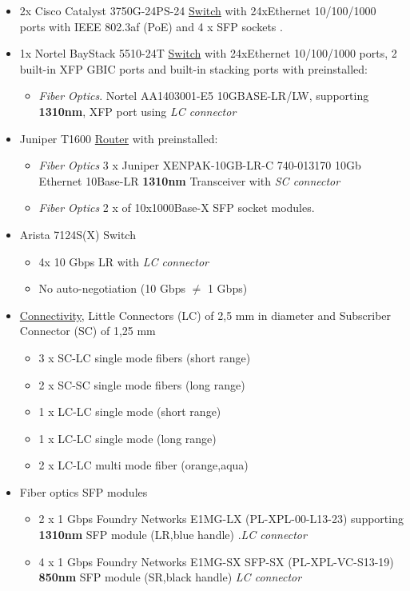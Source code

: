 \documentclass[10pt,a4paper]{article}
\begin{document}
\begin{itemize}
    \item 2x Cisco Catalyst 3750G-24PS-24 \underline{Switch} with 24xEthernet 10/100/1000 ports with IEEE 802.3af (PoE) and 4 x SFP sockets \cite{catalyst3750:datasheet}.
    \item 1x Nortel BayStack 5510-24T \underline{Switch} with 24xEthernet 10/100/1000 ports, 2 built-in XFP GBIC ports and built-in stacking ports \cite{Nortel-Networks-BayStack-5510-Switches} with preinstalled:
    \begin{itemize}
        \item \textit{Fiber Optics}. Nortel AA1403001-E5 10GBASE-LR/LW, supporting \textbf{1310nm}, XFP port\cite{Avaya-Installation-transceivers} using \textit{LC connector}
    \end{itemize}
    \item Juniper T1600 \underline{Router} with preinstalled:
    \begin{itemize}
        \item \textit{Fiber Optics} 3 x Juniper XENPAK-10GB-LR-C 740-013170 10Gb Ethernet 10Base-LR \textbf{1310nm} Transceiver with \textit{SC connector} \cite{Juniper-XENPAK-Transceiver}
        \item \textit{Fiber Optics} 2 x of 10x1000Base-X SFP socket modules.
    \end{itemize}
    \item Arista 7124S(X) Switch
    \begin{itemize}
        \item 4x 10 Gbps LR with \textit{LC connector}
        \item No auto-negotiation (10 Gbps $\neq$ 1 Gbps)
    \end{itemize}
    \item \underline{Connectivity}, Little Connectors (LC) of 2,5 mm in diameter and Subscriber Connector 
(SC) of 1,25 mm \cite{SC-vs-LC-FS-COM}
    \begin{itemize}
        \item 3 x SC-LC single mode fibers (short range)
        \item 2 x SC-SC single mode fibers (long range)
        \item 1 x LC-LC single mode (short range)
        \item 1 x LC-LC single mode (long range)
        \item 2 x LC-LC multi mode fiber (orange,aqua)
    \end{itemize}
    \item Fiber optics SFP modules
    \begin{itemize}
        \item 2 x 1 Gbps Foundry Networks E1MG-LX (PL-XPL-00-L13-23) supporting \textbf{1310nm} SFP module (LR,blue handle) \cite{FoundaryNetworks-E1MG-LX-1310nm-PL-XPL-00-L13-23}\cite{FoundaryNetworks-manual}.\textit{LC connector}
        \item 4 x 1 Gbps Foundry Networks E1MG-SX SFP-SX (PL-XPL-VC-S13-19) \textbf{850nm} SFP module (SR,black handle) \textit{LC connector}
    \end{itemize}
\end{itemize}
\end{document}
